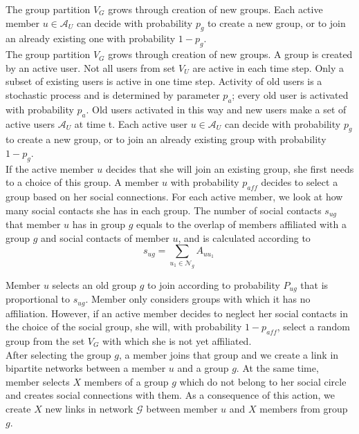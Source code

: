 The group partition $V_{G}$ grows through creation of new groups. Each active member $u\in \mathcal{A}_{U}$ can decide with probability $p_{g}$ to create a new group, or to join an already existing one with probability $1-p_{g}$. \\

The group partition $V_{G}$ grows through creation of new groups. A group is created by an active user. Not all users from set $V_{U}$ are active in each time step. Only a subset of existing users is active in one time step. Activity of old users is a stochastic process and is determined by parameter $p_{a}$; every old user is activated with probability $p_{a}$. Old users activated in this way and new users make a set of active users $\mathcal{A}_{U}$ at time t. Each active user $u\in \mathcal{A}_{U}$ can decide with probability $p_{g}$ to create a new group, or to join an already existing group with probability $1-p_{g}$. \\

If the active member $u$ decides that she will join an existing group, she first needs to a choice of this group. A member $u$ with probability $p_{aff}$ decides to select a group based on her social connections. For each active member, we look at how many social contacts she has in each group. The number of social contacts $s_{ug}$ that member $u$ has in group $g$ equals to the overlap of members affiliated with a group $g$ and social contacts of member $u$, and is calculated according to
\begin{equation}
s_{ug}=\sum_{u_{1}\in \mathcal{N}_{g}}
A_{uu_{1}} \label{eq1} \ 
\end{equation}

Member $u$ selects an old group $g$ to join according to probability $P_{ug}$ that is proportional to $s_{ug}$. Member only considers groups with which it has no affiliation. However, if an active member decides to neglect her social contacts in the choice of the social group, she will, with probability $1-p_{aff}$, select a random group from the set $V_{G}$ with which she is not yet affiliated. \\

After selecting the group $g$, a member joins that group and we create a link in bipartite networks between a member $u$ and a group $g$. At the same time, member selects $X$ members of a group $g$ which do not belong to her social circle and creates social connections with them. As a consequence of this action, we create $X$ new links in network $\mathcal{G}$ between member $u$ and $X$ members from group $g$.\\

